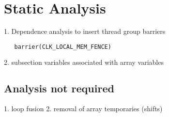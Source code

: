 \section{Static Analysis}
\label{sec:static-analysis}

1. Dependence analysis to insert thread group barriers

\begin{verbatim}
   barrier(CLK_LOCAL_MEM_FENCE)
\end{verbatim}

2. subsection variables associated with array variables

\subsection{Analysis not required}

1. loop fusion
2. removal of array temporaries (shifts)
